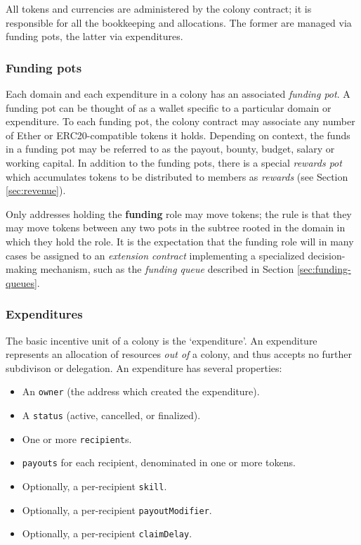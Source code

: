 All tokens and currencies are administered by the colony contract; it is responsible for all the bookkeeping and allocations. The former are managed via funding pots, the latter via expenditures.

\subsubsection{Funding pots}

Each domain and each expenditure in a colony has an associated \emph{funding pot}. A funding pot can be thought of as a wallet specific to a particular domain or expenditure. To each funding pot, the colony contract may associate any number of Ether or ERC20-compatible tokens it holds. Depending on context, the funds in a funding pot may be referred to as the payout, bounty, budget, salary or working capital. In addition to the funding pots, there is a special \emph{rewards pot} which accumulates tokens to be distributed to members as \textit{rewards} (see Section \ref{sec:revenue}).

Only addresses holding the \textbf{funding} role may move tokens; the rule is that they may move tokens between any two pots in the subtree rooted in the domain in which they hold the role. It is the expectation that the funding role will in many cases be assigned to an \textit{extension contract} implementing a specialized decision-making mechanism, such as the \textit{funding queue} described in Section \ref{sec:funding-queues}.

\subsubsection{Expenditures}

The basic incentive unit of a colony is the `expenditure'. An expenditure represents an allocation of resources \textit{out of} a colony, and thus accepts no further subdivison or delegation. An expenditure has several properties:

\begin{itemize}
\item An \texttt{owner} (the address which created the expenditure).
\item A \texttt{status} (active, cancelled, or finalized).
\item One or more \texttt{recipient}s.
\item \texttt{payouts} for each recipient, denominated in one or more tokens.
\item Optionally, a per-recipient \texttt{skill}.
\item Optionally, a per-recipient \texttt{payoutModifier}.
\item Optionally, a per-recipient \texttt{claimDelay}.
\end{itemize}

